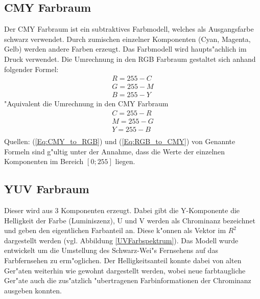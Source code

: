 \documentclass[a4paper]{article}
\begin{document}
\subsection{CMY Farbraum}
Der CMY Farbraum ist ein subtraktives Farbmodell, welches als Ausgangsfarbe schwarz verwendet. Durch
zumischen einzelner Komponenten (Cyan, Magenta, Gelb) werden andere Farben erzeugt. Das Farbmodell wird
haupts"achlich im Druck verwendet. Die Umrechnung in den RGB Farbraum gestaltet sich anhand folgender Formel:
\begin{equation}
	\label{Eq:CMY_to_RGB}
	\begin{split}
	R = 255 - C\\
	G = 255 - M\\
	B = 255 - Y
	\end{split}
\end{equation}
"Aquivalent die Umrechnung in den CMY Farbraum
\begin{equation}
	\label{Eq:RGB_to_CMY}
	\begin{split}
		C = 255 - R\\
		M = 255 - G\\
		Y = 255 - B\\
	\end{split}
\end{equation}
Quellen: (\ref{Eq:CMY_to_RGB}) und (\ref{Eq:RGB_to_CMY}) von \cite{CMYPage}\newline
Genannte Formeln sind g"ultig unter der Annahme, dass die Werte der einzelnen Komponenten im Bereich $[0;255]$ liegen.


\subsection{YUV Farbraum}
Dieser wird aus 3 Komponenten erzeugt. Dabei gibt die Y-Komponente die Helligkeit der Farbe (Luminiszenz), 
U und V werden als Chrominanz bezeichnet und geben den eigentlichen Farbanteil an. Diese k"onnen als
Vektor im $R^2$ dargestellt werden (vgl. Abbildung \ref{UVFarbspektrum}). Das Modell wurde entwickelt
um die Umstellung des Schwarz-Wei"s Fernsehens auf das Farbfernsehen zu erm"oglichen. Der Helligkeitsanteil
konnte dabei von alten Ger"aten weiterhin wie gewohnt dargestellt werden, wobei neue farbtaugliche Ger"ate
auch die zus"atzlich "ubertragenen Farbinformationen der Chrominanz ausgeben konnten. 
\end{document}
